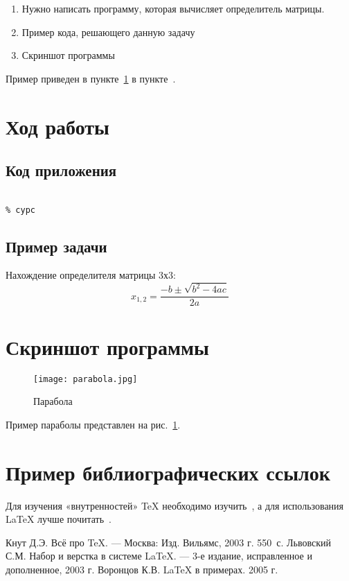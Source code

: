 \documentclass[12pt,a4paper]{scrartcl}
\begin{document}
\begin{enumerate}
 \item Нужно написать программу, которая вычисляет определитель матрицы.
 \item Пример кода, решающего данную задачу
 \item Скриншот программы
\end{enumerate}

Пример приведен в пункте~\ref{sec:exp} в пункте~\pageref{sec:exp}.

\section{Ход работы}
\label{sec:exp}

\subsection{Код приложения}
\label{sec:exp:code}
\begin{verbatim}

% сурс
\end{verbatim}

\subsection{Пример задачи}
\label{sec:mathexample}

Нахождение определителя матрицы 3х3:
\begin{equation}\label{eq:solv}
 x_{1,2}=\frac{-b\pm\sqrt{b^2-4ac}}{2a}
\end{equation}

\section{Скриншот программы}
\label{sec:picexample}
\begin{figure}[h]
	\centering
	\texttt{[image: parabola.jpg]}
	\caption{Парабола}\label{fig:par}
\end{figure}

Пример параболы представлен на рис.~\ref{fig:par}.

\section{Пример библиографических ссылок}

Для изучения «внутренностей» \TeX{} необходимо 
изучить~\cite{Knuth-2003}, а для использования \LaTeX{} лучше
почитать~\cite{Lvovsky-2003, Voroncov-2005}.

\begin{thebibliography}{9}
Кнут Д.Э. Всё про \TeX. \newblock --- Москва: Изд. Вильямс, 2003 г. 550~с.
Львовский С.М. Набор и верстка в системе \LaTeX{}. \newblock --- 3-е издание, исправленное и дополненное, 2003 г.
Воронцов К.В. \LaTeX{} в примерах. 2005 г.
\end{thebibliography}
\end{document}
